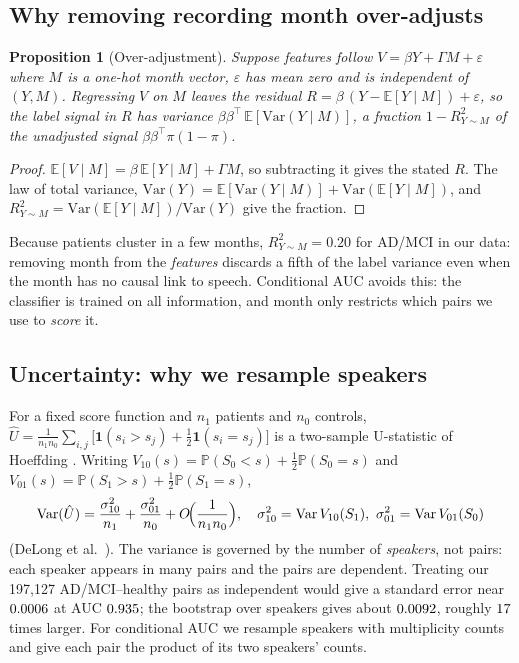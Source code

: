 \documentclass[10pt]{article}
\newtheorem{proposition}{Proposition}
\newcommand{\Prob}{\mathbb{P}}
\begin{document}
\subsection{Why removing recording month over-adjusts}
\begin{proposition}[Over-adjustment]\label{prop:overadj}
Suppose features follow $V=\beta Y+\Gamma M+\varepsilon$ where $M$ is a one-hot month vector, $\varepsilon$ has mean zero and is independent of $(Y,M)$. Regressing $V$ on $M$ leaves the residual $R=\beta\,(Y-\mathbb E[Y\mid M])+\varepsilon$, so the label signal in $R$ has variance $\beta\beta^\top\,\mathbb E[\mathrm{Var}(Y\mid M)]$, a fraction $1-R^2_{Y\sim M}$ of the unadjusted signal $\beta\beta^\top\pi(1-\pi)$.
\end{proposition}
\begin{proof}
$\mathbb E[V\mid M]=\beta\,\mathbb E[Y\mid M]+\Gamma M$, so subtracting it gives the stated $R$. The law of total variance, $\mathrm{Var}(Y)=\mathbb E[\mathrm{Var}(Y\mid M)]+\mathrm{Var}(\mathbb E[Y\mid M])$, and $R^2_{Y\sim M}=\mathrm{Var}(\mathbb E[Y\mid M])/\mathrm{Var}(Y)$ give the fraction. \qedhere
\end{proof}
Because patients cluster in a few months, $R^2_{Y\sim M}=0.20$ for AD/MCI in our data: removing month from the \emph{features} discards a fifth of the label variance even when the month has no causal link to speech. Conditional AUC avoids this: the classifier is trained on all information, and month only restricts which pairs we use to \emph{score} it.

\subsection{Uncertainty: why we resample speakers}
For a fixed score function and $n_1$ patients and $n_0$ controls, $\hat U=\frac1{n_1n_0}\sum_{i,j}\bigl[\mathbf 1(s_i>s_j)+\tfrac12\mathbf 1(s_i=s_j)\bigr]$ is a two-sample U-statistic of Hoeffding \cite{hoeffding1948}. Writing $V_{10}(s)=\Prob(S_0<s)+\tfrac12\Prob(S_0=s)$ and $V_{01}(s)=\Prob(S_1>s)+\tfrac12\Prob(S_1=s)$,
\[
\mathrm{Var}(\hat U)=\frac{\sigma_{10}^2}{n_1}+\frac{\sigma_{01}^2}{n_0}+O\!\Bigl(\frac1{n_1n_0}\Bigr),\quad \sigma_{10}^2=\mathrm{Var}\,V_{10}(S_1),\ \sigma_{01}^2=\mathrm{Var}\,V_{01}(S_0)
\]
(DeLong et al.\ \cite{delong1988}). The variance is governed by the number of \emph{speakers}, not pairs: each speaker appears in many pairs and the pairs are dependent. Treating our 197{,}127 AD/MCI--healthy pairs as independent would give a standard error near $0.0006$ at AUC $0.935$; the bootstrap over speakers gives about $0.0092$, roughly $17$ times larger. For conditional AUC we resample speakers with multiplicity counts and give each pair the product of its two speakers' counts.
\end{document}
